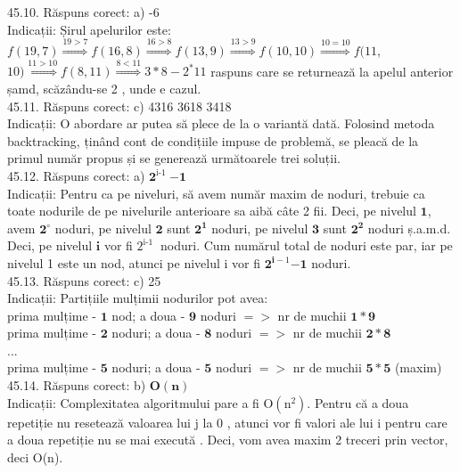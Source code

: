 45.10. Răspuns corect: a) -6\\
Indicații: Șirul apelurilor este: $f(19,7) \stackrel{19>7}{\Longrightarrow} f(16,8) \stackrel{16>8}{\Longrightarrow} f(13,9) \stackrel{13>9}{\Longrightarrow} f(10,10) \stackrel{10=10}{\Longrightarrow} f(11$, $10) \stackrel{11>10}{\Longrightarrow} f(8,11) \stackrel{8<11}{\Longrightarrow} 3 * 8-2^{*} 11$ raspuns care se returnează la apelul anterior șamd, scăzându-se 2 , unde e cazul.\\

45.11. Răspuns corect: c) 4316  3618  3418\\
Indicații: O abordare ar putea să plece de la o variantă dată. Folosind metoda backtracking, ținând cont de condițiile impuse de problemă, se pleacă de la primul număr propus și se generează următoarele trei soluții.\\

45.12. Răspuns corect: a) $\mathbf{2}^{\text {i-1 }} \mathbf{- 1}$\\
Indicații: Pentru ca pe niveluri, să avem număr maxim de noduri, trebuie ca toate nodurile de pe nivelurile anterioare sa aibă câte 2 fii. Deci, pe nivelul $\mathbf{1}$, avem $\mathbf{2}^{\circ}$ noduri, pe nivelul $\mathbf{2}$ sunt $\mathbf{2}^{\mathbf{1}}$ noduri, pe nivelul $\mathbf{3}$ sunt $\mathbf{2}^{\mathbf{2}}$ noduri ș.a.m.d. Deci, pe nivelul $\mathbf{i}$ vor fi $2^{\text {i-1 }}$ noduri. Cum numărul total de noduri este par, iar pe nivelul 1 este un nod, atunci pe nivelul i vor fi $\mathbf{2}^{\mathbf{i}-1} \mathbf{- 1}$ noduri.\\

45.13. Răspuns corect: c) 25\\
Indicații: Partițiile mulțimii nodurilor pot avea:\\
prima mulțime - $\mathbf{1}$ nod; a doua - $\mathbf{9}$ noduri $=>$ nr de muchii $\mathbf{1 * 9}$\\
prima mulțime - $\mathbf{2}$ noduri; a doua - $\mathbf{8}$ noduri $=>$ nr de muchii $\mathbf{2 * 8}$\\
...\\
prima mulțime - $\mathbf{5}$ noduri; a doua - $\mathbf{5}$ noduri $=>$ nr de muchii $\mathbf{5*5}$ (maxim)\\

45.14. Răspuns corect: b) $\mathbf{O(n)}$\\
Indicații: Complexitatea algoritmului pare a fi $\mathrm{O}\left(\mathrm{n}^{2}\right)$. Pentru că a doua repetiție nu resetează valoarea lui j la 0 , atunci vor fi valori ale lui i pentru care a doua repetiție nu se mai execută . Deci, vom avea maxim 2 treceri prin vector, deci O(n).\\

